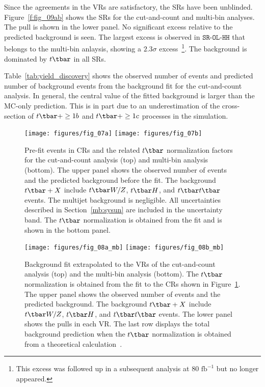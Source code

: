 Since the agreements in the VRs are satisfactory, the SRs have been unblinded.
Figure~\ref{f:fig_09ab} shows the SRs for the cut-and-count and multi-bin
analyses. The pull is shown in the lower panel. No significant excess relative
to the predicted background is seen. The largest excess is observed in
$\texttt{SR-OL-HH}$ that belongs to the multi-bin anlaysis, showing a
$2.3\sigma$ excess~\footnote{This excess was followed up in a subsequent
	analysis at $80\text{ fb}^{-1}$ but no longer appeared.}. The background is
dominated by $t\tbar$ in all SRs.

Table~\ref{tab:yield_discovery} shows the observed number of events and
predicted number of background events from the background fit for the
cut-and-count analysis. In general, the central value of the fitted background
is larger than the MC-only prediction. This is in part due to an
underestimation of the cross-section of $t\tbar+ \geq 1b$ and $t\tbar+ \geq 1c$
processes in the simulation.

\begin{figure}[H]
	\texttt{[image: figures/fig\_07a]}
	\texttt{[image: figures/fig\_07b]}
	\centering

	\caption{Pre-fit events in CRs and the related $t\tbar$ normalization factors
		for the cut-and-count analysis (top) and multi-bin analysis (bottom). The
		upper panel shows the observed number of events and the predicted background
		before the fit. The background $t\tbar+X$ include $t\tbar W/Z$, $t\tbar H$,
		and $t\tbar t\tbar$ events. The multijet background is negligible. All
		uncertainties described in Section~\ref{mb:sysun} are included in the
		uncertainty band. The $t\tbar$ normalization is obtained from the fit and is
		shown in the bottom panel.}

	\label{f:fig_07ab}
\end{figure}



\begin{figure}[H]
	\texttt{[image: figures/fig\_08a\_mb]}
	\texttt{[image: figures/fig\_08b\_mb]}
	\centering

	\caption{Background fit extrapolated to the VRs of the cut-and-count analysis
		(top) and the multi-bin analysis (bottom). The $t\tbar$ normalization is
		obtained from the fit to the CRs shown in Figure~\ref{f:fig_07ab}. The upper
		panel shows the observed number of events and the predicted background. The
		background $t\tbar+X$ include $t\tbar W/Z$, $t\tbar H$, and $t\tbar t\tbar$
		events. The lower panel shows the pulls in each VR. The last row displays the
		total background prediction when the $t\tbar$ normalization is obtained from a
		theoretical calculation~\cite{Czakon:2011xx}.}

	\label{f:fig_08ab}
\end{figure}

